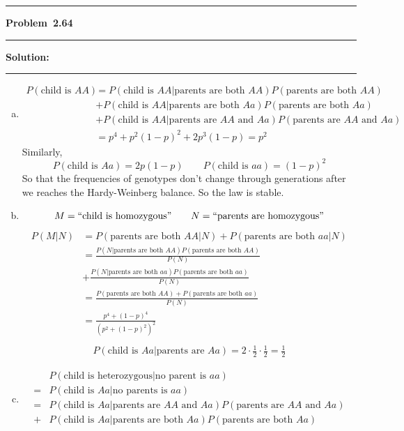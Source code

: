 \documentclass[10.5pt]{article}
\newcommand\question[1]{\vspace{.2in}\hrule\vspace{0.04in}\textbf{Problem\ #1}\vspace{.4em}\hrule\vspace{.10in}}
\newcommand\Solution{\vspace{.3in}\textbf{Solution:}\vspace{.5em}\hrule\vspace{.08in}\par}
\begin{document}
\pagebreak

\question{2.64}
\Solution{}
\begin{enumerate}[(a)]
	\item \begin{align*}
		P(\text{child is $AA$}) 
		&= P(\text{child is $AA$}|\text{parents are both $AA$})P(\text{parents are both $AA$})\\[8pt]
		&+P(\text{child is $AA$}|\text{parents are both $Aa$})P(\text{parents are both $Aa$})\\[8pt]
		&+P(\text{child is $AA$}|\text{parents are $AA$ and $Aa$})P(\text{parents are $AA$ and $Aa$})\\[8pt]
		&=p^4+p^2(1-p)^2+2p^3(1-p) = p^2
	\end{align*}
	Similarly, $$P(\text{child is $Aa$}) = 2p(1-p)\qquad P(\text{child is $aa$}) = (1-p)^2$$
	So that the frequencies of genotypes don't change through generations after we reaches the Hardy-Weinberg balance. So the law is stable.
	\vspace{1cm}
	\item $$M = ``\text{child is homozygous}"\qquad N = ``\text{parents are homozygous}"$$
	\begin{align*}
		P(M|N)
		&= P(\text{parents are both $AA$}|N)+P(\text{parents are both $aa$}|N)\\[8pt]
		&= \frac{P(N|\text{parents are both $AA$})P(\text{parents are both $AA$})}{P(N)}\\[8pt]
		&+\frac{P(N|\text{parents are both $aa$})P(\text{parents are both $aa$})}{P(N)}\\[8pt]
		&=\frac{P(\text{parents are both $AA$})+P(\text{parents are both $aa$})}{P(N)}\\[8pt]
		&=\frac{p^4+(1-p)^4}{(p^2+(1-p)^2)^2}\\[8pt]
	\end{align*}
	\begin{align*}
		P(\text{child is $Aa$}|\text{parents are $Aa$})= 2\cdot \frac{1}{2}\cdot\frac{1}{2} = \frac{1}{2}
	\end{align*}
	\pagebreak
	\item \begin{align*}
		&P(\text{child is heterozygous}|\text{no parent is $aa$})\\[8pt]
		=& P(\text{child is $Aa$}|\text{no parents is $aa$})\\[8pt]
		=& P(\text{child is $Aa$}|\text{parents are $AA$ and $Aa$})P(\text{parents are $AA$ and $Aa$})\\[8pt]
		+& P(\text{child is $Aa$}|\text{parents are both $Aa$})P(\text{parents are both $Aa$})\\[8pt]

\end{align*}
\end{enumerate}
\end{document}
